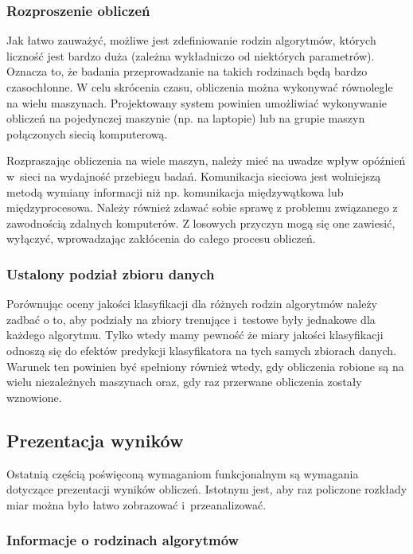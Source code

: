 \documentclass[../thesis.tex]{subfiles}
\begin{document}
\subsubsection{Rozproszenie obliczeń}

Jak łatwo zauważyć, możliwe jest zdefiniowanie rodzin algorytmów, których liczność jest bardzo duża (zależna wykładniczo od niektórych parametrów). Oznacza to, że badania przeprowadzanie na takich rodzinach będą bardzo czasochłonne. W celu skrócenia czasu, obliczenia można wykonywać równolegle na wielu maszynach. Projektowany system powinien umożliwiać wykonywanie obliczeń na pojedynczej maszynie (np. na laptopie) lub na grupie maszyn połączonych siecią komputerową.

Rozpraszając obliczenia na wiele maszyn, należy mieć na uwadze wpływ opóźnień w~sieci na wydajność przebiegu badań. Komunikacja sieciowa jest wolniejszą metodą wymiany informacji niż np. komunikacja międzywątkowa lub międzyprocesowa. Należy również zdawać sobie sprawę z problemu związanego z zawodnością zdalnych komputerów. Z losowych przyczyn mogą się one zawiesić, wyłączyć, wprowadzając zakłócenia do całego procesu obliczeń. 

\subsubsection{Ustalony podział zbioru danych}

Porównując oceny jakości klasyfikacji dla różnych rodzin algorytmów należy zadbać o to, aby podziały na zbiory trenujące i~testowe były jednakowe dla każdego algorytmu. Tylko wtedy mamy pewność że miary jakości klasyfikacji odnoszą się do efektów predykcji klasyfikatora na tych samych zbiorach danych. Warunek ten powinien być spełniony również wtedy, gdy obliczenia robione są na wielu niezależnych maszynach oraz, gdy raz przerwane obliczenia zostały wznowione.

\subsection{Prezentacja wyników}

Ostatnią częścią poświęconą wymaganiom funkcjonalnym są wymagania dotyczące prezentacji wyników obliczeń. Istotnym jest, aby raz policzone rozkłady miar można było łatwo zobrazować i~przeanalizować.

\subsubsection{Informacje o rodzinach algorytmów}
\end{document}

